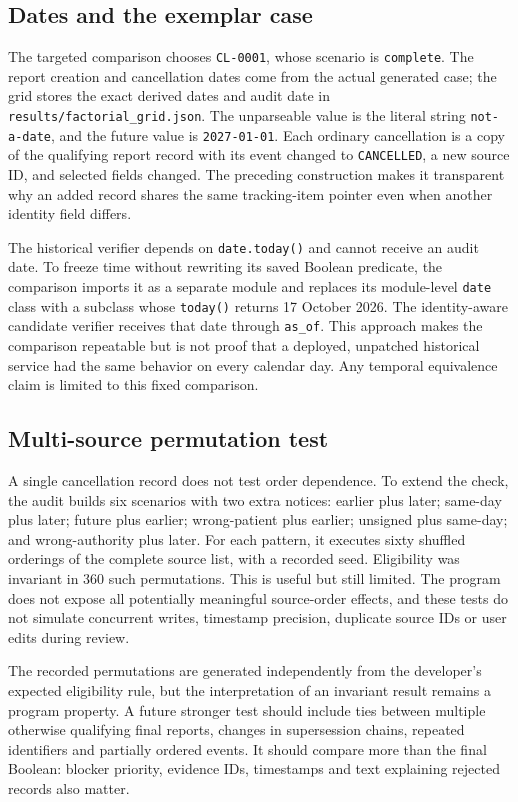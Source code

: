 \documentclass[11pt,twocolumn]{article}
\newcommand{\code}[1]{\texttt{#1}}
\begin{document}
\subsection{Dates and the exemplar case}
The targeted comparison chooses \code{CL-0001}, whose scenario is \code{complete}. The report creation and cancellation dates come from the actual generated case; the grid stores the exact derived dates and audit date in \code{results/factorial\_grid.json}. The unparseable value is the literal string \code{not-a-date}, and the future value is \code{2027-01-01}. Each ordinary cancellation is a copy of the qualifying report record with its event changed to \code{CANCELLED}, a new source ID, and selected fields changed. The preceding construction makes it transparent why an added record shares the same tracking-item pointer even when another identity field differs.

The historical verifier depends on \code{date.today()} and cannot receive an audit date. To freeze time without rewriting its saved Boolean predicate, the comparison imports it as a separate module and replaces its module-level \code{date} class with a subclass whose \code{today()} returns 17 October 2026. The identity-aware candidate verifier receives that date through \code{as\_of}. This approach makes the comparison repeatable but is not proof that a deployed, unpatched historical service had the same behavior on every calendar day. Any temporal equivalence claim is limited to this fixed comparison.

\subsection{Multi-source permutation test}
A single cancellation record does not test order dependence. To extend the check, the audit builds six scenarios with two extra notices: earlier plus later; same-day plus later; future plus earlier; wrong-patient plus earlier; unsigned plus same-day; and wrong-authority plus later. For each pattern, it executes sixty shuffled orderings of the complete source list, with a recorded seed. Eligibility was invariant in 360 such permutations. This is useful but still limited. The program does not expose all potentially meaningful source-order effects, and these tests do not simulate concurrent writes, timestamp precision, duplicate source IDs or user edits during review.

The recorded permutations are generated independently from the developer's expected eligibility rule, but the interpretation of an invariant result remains a program property. A future stronger test should include ties between multiple otherwise qualifying final reports, changes in supersession chains, repeated identifiers and partially ordered events. It should compare more than the final Boolean: blocker priority, evidence IDs, timestamps and text explaining rejected records also matter.
\end{document}
